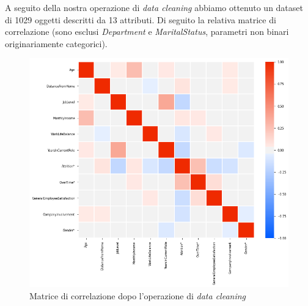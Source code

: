 A seguito della nostra operazione di \textit{data cleaning} abbiamo ottenuto un dataset di 1029 oggetti descritti da 13 attributi. Di seguito la relativa matrice di correlazione (sono esclusi \textit{Department} e \textit{MaritalStatus}, parametri non binari originariamente categorici).
\vspace{2em}
\begin{figure}[H]
    \centering
    \includegraphics[scale=0.50]{Immagini/neoMatrix.png} %
    \caption{Matrice di correlazione dopo l'operazione di \textit{data cleaning}}
    \label{fig:MatrCorrelPostDataClean}
\end{figure}


